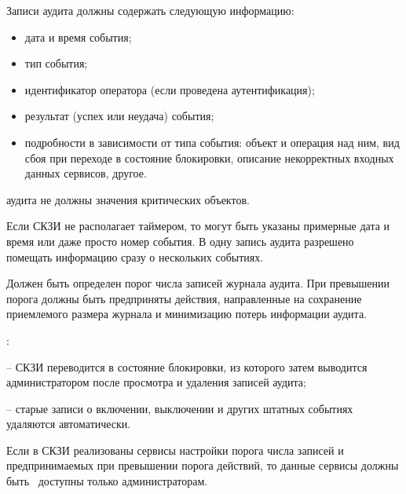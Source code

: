 \label{R.AU.Records}
Записи аудита должны содержать следующую информацию:
\begin{itemize} 
\item
дата и время события;
\item
тип события; 
\item
идентификатор оператора (если проведена аутентификация); 
\item
результат (успех или неудача) события; 
\item
подробности в зависимости от типа события:
объект и операция над ним,
вид сбоя при переходе в состояние блокировки,
описание некорректных входных данных сервисов,
другое.
\end{itemize}
 аудита не должны  значения 
критических объектов.

\begin{note}
Если СКЗИ не располагает таймером, то могут быть указаны примерные дата и время
или даже просто номер события.
%
В одну запись аудита разрешено помещать информацию сразу о нескольких событиях. 
\end{note}


\label{R.AU.Over}
Должен быть определен порог числа записей журнала аудита.
При превышении порога должны быть предприняты действия,
направленные на сохранение приемлемого размера журнала
и минимизацию потерь информации аудита.

\begin{note}
:

-- СКЗИ переводится в состояние блокировки, из которого затем выводится
администратором после просмотра и удаления записей аудита;

-- старые записи о включении, выключении и других штатных событиях удаляются 
автоматически. 
\end{note}

\label{R.AU.Settings}
Если в СКЗИ реализованы сервисы настройки порога числа записей и 
предпринимаемых при превышении порога действий, то данные сервисы должны 
быть~ доступны только администраторам. 

